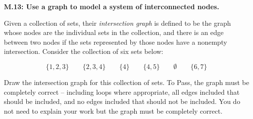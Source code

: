 \documentclass[11pt]{article}
\begin{document}
	
	\thispagestyle{empty}
	\renewcommand{\headrulewidth}{1pt}
	\thispagestyle{fancy}
	\lfoot{}
	\cfoot{}
	\rfoot{}	
	
	\vspace*{0in}

\noindent 
\textbf{M.13: Use a graph to model a system of interconnected nodes.}

\bigskip

Given a collection of sets, their \emph{intersection graph} is defined to be the graph whose nodes are the individual sets in the collection, and there is an edge between two nodes if the sets represented by those nodes have a nonempty intersection. Consider the collection of six sets below: 

$$\{1,2,3\} \qquad \{2,3,4\} \qquad \{4\} \qquad \{4,5\} \qquad \emptyset \qquad \{6,7\}$$

Draw the intersection graph for this collection of sets. To Pass, the graph must be completely correct -- including loops where appropriate, all edges included that should be included, and no edges included that should not be included. You do not need to explain your work but the graph must be completely correct. 
 
\end{document}
